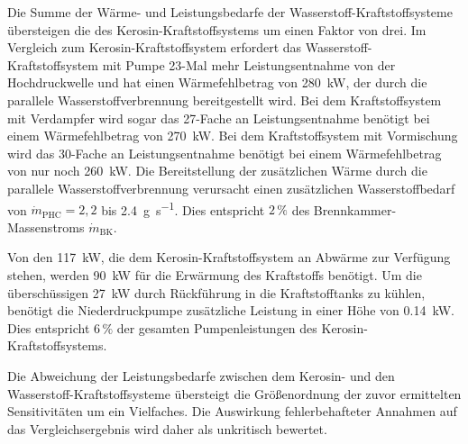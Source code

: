 Die Summe der Wärme- und Leistungsbedarfe der Wasserstoff-Kraftstoffsysteme übersteigen die des Kerosin-Kraftstoffsystems um einen Faktor von drei. Im Vergleich zum Kerosin-Kraftstoffsystem erfordert das Wasserstoff-Kraftstoffsystem mit Pumpe 23-Mal mehr Leistungsentnahme von der Hochdruckwelle und hat einen Wärmefehlbetrag von \SI{280}{\kilo\W}, der durch die parallele Wasserstoffverbrennung bereitgestellt wird. Bei dem Kraftstoffsystem mit Verdampfer wird sogar das 27-Fache an Leistungsentnahme benötigt bei einem Wärmefehlbetrag von \SI{270}{\kilo\W}. Bei dem Kraftstoffsystem mit Vormischung wird das 30-Fache an Leistungsentnahme benötigt bei einem Wärmefehlbetrag von nur noch \SI{260}{\kilo\W}. Die Bereitstellung der zusätzlichen Wärme durch die parallele Wasserstoffverbrennung verursacht einen zusätzlichen Wasserstoffbedarf von $\dot{m}_\mathrm{PHC}=2,2$ bis \SI{2.4}{\g\per\s}. Dies entspricht $2\,\%$ des Brennkammer-Massenstroms $\dot{m}_\mathrm{BK}$.

Von den \SI{117}{\kilo\W}, die dem Kerosin-Kraftstoffsystem an Abwärme zur Verfügung stehen, werden \SI{90}{\kilo\W} für die Erwärmung des Kraftstoffs benötigt. Um die überschüssigen \SI{27}{\kilo\W} durch Rückführung in die Kraftstofftanks zu kühlen, benötigt die Niederdruckpumpe zusätzliche Leistung in einer Höhe von \SI{0,14}{\kilo\W}. Dies entspricht $6\,\%$ der gesamten Pumpenleistungen des Kerosin-Kraftstoffsystems.

Die Abweichung der Leistungsbedarfe zwischen dem Kerosin- und den Wasserstoff-Kraftstoffsysteme übersteigt die Größenordnung der zuvor ermittelten Sensitivitäten um ein Vielfaches. Die Auswirkung fehlerbehafteter Annahmen auf das Vergleichsergebnis wird daher als unkritisch bewertet. 

